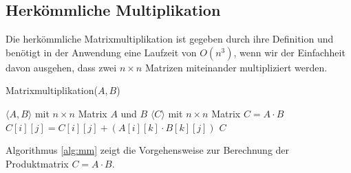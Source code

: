 \documentclass{report}
\numberwithin{equation}{section}
\begin{document}
\subsection{Herkömmliche Multiplikation}
Die herkömmliche Matrixmultiplikation ist gegeben durch ihre Definition und benötigt in der Anwendung eine Laufzeit von $O(n^3)$, wenn wir der Einfachheit davon ausgehen, dass zwei $n \times n$ Matrizen miteinander multipliziert werden.
\begin{algorithm}
	\caption{Matrixmultiplikation($A, B$)}
	\label{alg:mm}
	\begin{algorithmic}[1]
		\Require $\langle A, B\rangle$ mit $n \times n$ Matrix $A$ und $B$
		\Ensure $\langle C\rangle$ mit $n \times n$ Matrix $C = A \cdot B$
		\State $C[i][j] = C[i][j] + (A[i][k] \cdot B[k][j])$
		\EndFor
		\EndFor
		\EndFor
		\State \Return $C$
	\end{algorithmic}
\end{algorithm}
Algorithmus \ref{alg:mm} zeigt die Vorgehensweise zur Berechnung der Produktmatrix $C = A \cdot B$.
\end{document}
